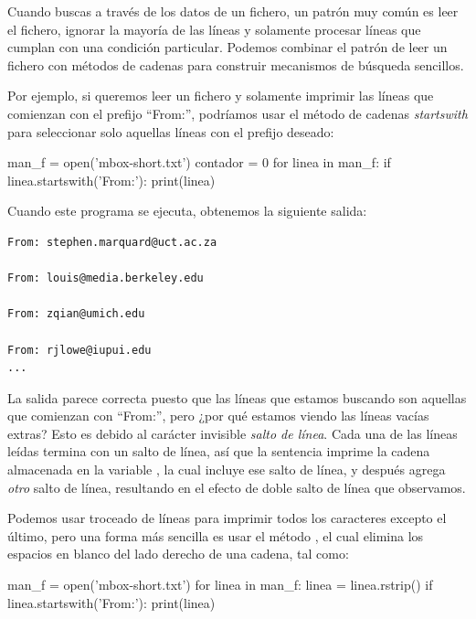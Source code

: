 Cuando buscas a través de los datos de un fichero, un patrón muy común
es leer el fichero, ignorar la mayoría de las líneas y solamente
procesar líneas que cumplan con una condición particular. Podemos
combinar el patrón de leer un fichero con métodos de cadenas para
construir mecanismos de búsqueda sencillos.

 

Por ejemplo, si queremos leer un fichero y solamente imprimir las líneas
que comienzan con el prefijo ``From:'', podríamos usar el método de
cadenas \emph{startswith} para seleccionar solo aquellas líneas con el
prefijo deseado:

\begin{python}[frame=single]
man_f = open('mbox-short.txt')
contador = 0
for linea in man_f:
    if linea.startswith('From:'):
        print(linea)
\end{python}

Cuando este programa se ejecuta, obtenemos la siguiente salida:

\begin{Verbatim}[frame=single]
From: stephen.marquard@uct.ac.za

From: louis@media.berkeley.edu

From: zqian@umich.edu

From: rjlowe@iupui.edu
...
\end{Verbatim}

La salida parece correcta puesto que las líneas que estamos buscando son
aquellas que comienzan con ``From:'', pero ¿por qué estamos viendo las
líneas vacías extras? Esto es debido al carácter invisible \emph{salto
de línea}. Cada una de las líneas leídas termina con un salto de línea,
así que la sentencia  imprime la cadena almacenada en la
variable , la cual incluye ese salto de línea, y después
 agrega \emph{otro} salto de línea, resultando en el
efecto de doble salto de línea que observamos.

Podemos usar troceado de líneas para imprimir todos los caracteres
excepto el último, pero una forma más sencilla es usar el método
, el cual elimina los espacios en blanco del lado derecho
de una cadena, tal como:

\begin{python}[frame=single]
man_f = open('mbox-short.txt')
for linea in man_f:
    linea = linea.rstrip()
    if linea.startswith('From:'):
        print(linea)
\end{python}

